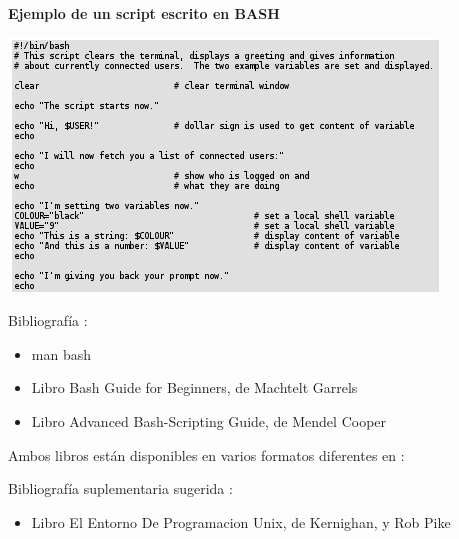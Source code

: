 \documentclass{beamer}
\begin{document}
\begin{frame}{}
\textbf{Ejemplo de un script escrito en BASH }

\begin{center}
 \includegraphics{script2.png}
\end{center}

\end{frame}

\begin{frame}{}
Bibliografía : 
\begin{itemize}
\item man bash
\item Libro Bash Guide for Beginners, de Machtelt Garrels 
\item Libro Advanced Bash-Scripting Guide, de Mendel Cooper
\end{itemize}

Ambos libros están disponibles en varios formatos diferentes en :

Bibliografía suplementaria sugerida : 
\begin{itemize}
\item Libro El Entorno De Programacion Unix, de Kernighan, y Rob Pike
\end{itemize}

\end{frame}
\end{document}
